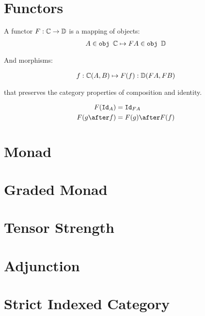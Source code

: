 \documentclass{Report}
\begin{document}
\section{Functors}
A functor $F: \mathbb{C} \rightarrow \mathbb{D}$ is a mapping of objects:
\begin{align}
    A\in\texttt{obj }\mathbb{C} \mapsto FA \in \texttt{obj }\mathbb{D}
\end{align}

And morphisms:

\begin{align}
    f: \mathbb{C}(A, B) \mapsto F(f): \mathbb{D}(FA, FB)
\end{align}

that preserves the category properties of composition and identity.

\begin{align}
    F(\Id{A}) & = \Id{FA} \\
    F(g\after f) & = F(g)\after F(f)
\end{align}

\section{Monad}

\section{Graded Monad}

\section{Tensor Strength}

\section{Adjunction}

\section{Strict Indexed Category}
\end{document}
